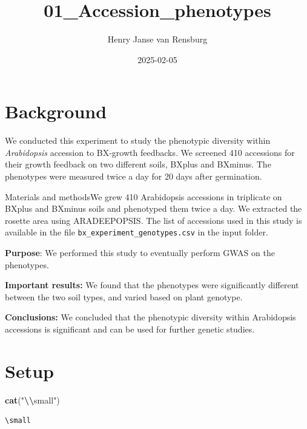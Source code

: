 \documentclass[
  11pt,
]{article}
\title{01\_Accession\_phenotypes}
\author{Henry Janse van Rensburg}
\date{2025-02-05}
\newenvironment{Shaded}{\begin{snugshade}}{\end{snugshade}}
\newcommand{\FunctionTok}[1]{\textcolor[rgb]{0.13,0.29,0.53}{\textbf{#1}}}
\newcommand{\NormalTok}[1]{#1}
\newcommand{\SpecialCharTok}[1]{\textcolor[rgb]{0.81,0.36,0.00}{\textbf{#1}}}
\newcommand{\StringTok}[1]{\textcolor[rgb]{0.31,0.60,0.02}{#1}}
\renewcommand*\contentsname{Table of contents}
\newcommand\contentsname{Table of contents}
\begin{document}
\maketitle

\renewcommand*\contentsname{Table of contents}
{
\hypersetup{linkcolor=}
\setcounter{tocdepth}{2}
\tableofcontents
}

\section{Background}\label{background}

We conducted this experiment to study the phenotypic diversity within
\emph{Arabidopsis} accession to BX-growth feedbacks. We screened 410
accessions for their growth feedback on two different soils, BXplus and
BXminus. The phenotypes were measured twice a day for 20 days after
germination.

Materials and methodsWe grew 410 Arabidopsis accessions in triplicate on
BXplus and BXminus soils and phenotyped them twice a day. We extracted
the rosette area using ARADEEPOPSIS. The list of accessions used in this
study is available in the file \texttt{bx\_experiment\_genotypes.csv} in
the input folder.

\textbf{Purpose}: We performed this study to eventually perform GWAS on
the phenotypes.

\textbf{Important results:} We found that the phenotypes were
significantly different between the two soil types, and varied based on
plant genotype.

\textbf{Conclusions:} We concluded that the phenotypic diversity within
Arabidopsis accessions is significant and can be used for further
genetic studies.

\section{Setup}\label{setup}

\begin{Shaded}
\begin{Highlighting}[]
\FunctionTok{cat}\NormalTok{(}\StringTok{"}\SpecialCharTok{\textbackslash{}\textbackslash{}}\StringTok{small"}\NormalTok{)}
\end{Highlighting}
\end{Shaded}

\begin{verbatim}
\small
\end{verbatim}
\end{document}
